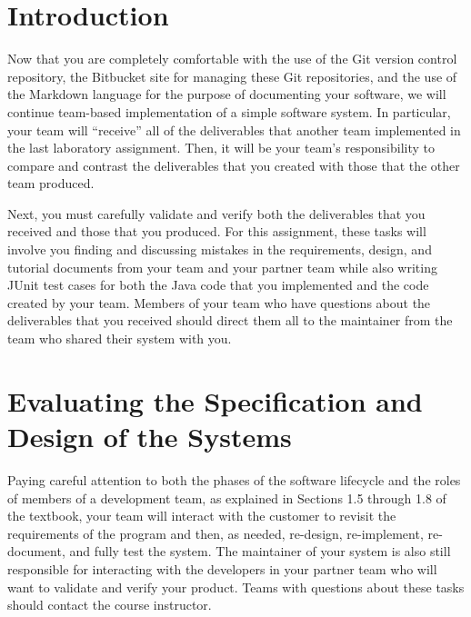 

\usepackage[compact]{titlesec}



\vspace*{-.1in}
\section*{Introduction}

Now that you are completely comfortable with the use of the Git version control repository, the Bitbucket site for managing
these Git repositories, and the use of the Markdown language for the purpose of documenting your software, we will
continue team-based implementation of a simple software system. In particular, your team will ``receive'' all of the
deliverables that another team implemented in the last laboratory assignment. Then, it will be your team's
responsibility to compare and contrast the deliverables that you created with those that the other team produced.

Next, you must carefully validate and verify both the deliverables that you received and those that you produced. For
this assignment, these tasks will involve you finding and discussing mistakes in the requirements, design, and tutorial
documents from your team and your partner team while also writing JUnit test cases for both the Java code that you
implemented and the code created by your team. Members of your team who have questions about the deliverables that you
received should direct them all to the maintainer from the team who shared their system with you.

\section*{Evaluating the Specification and Design of the Systems}

Paying careful attention to both the phases of the software lifecycle and the roles of members of a development team, as
explained in Sections 1.5 through 1.8 of the textbook, your team will interact with the customer to revisit the
requirements of the program and then, as needed, re-design, re-implement, re-document, and fully test the system.  The
maintainer of your system is also still responsible for interacting with the developers in your partner team who will
want to validate and verify your product. Teams with questions about these tasks should contact the course instructor.

